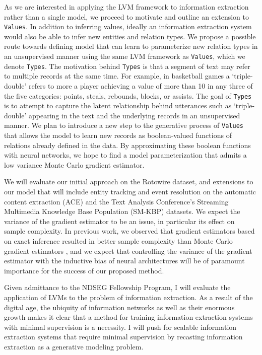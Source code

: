 \documentclass[11pt]{article}
\begin{document}
As we are interested in applying the LVM framework to information extraction rather than a single model,
we proceed to motivate and outline an extension to \texttt{Values}.
In addition to inferring values, ideally an information extraction system 
would also be able to infer new entities and relation types.
We propose a possible route towards defining model that can
learn to parameterize new relation types in an
unsupervised manner using the same LVM framework as \texttt{Values},
which we denote \texttt{Types}.
The motivation behind \texttt{Types} is that a segment of text may refer to multiple records at the same time.
For example, in basketball games a `triple-double' refers to more a player achieving a value of more than 10
in any three of the five categories: points, steals, rebounds, blocks, or assists.
The goal of \texttt{Types} is to attempt to capture the latent relationship behind utterances
such as `triple-double' appearing in the text and the underlying records in an unsupervised manner.
We plan to introduce a new step to the generative process of \texttt{Values} that 
allows the model to learn new records as boolean-valued functions of relations already defined in the data.
By approximating these boolean functions with neural networks, we hope to find a model
parameterization that admits a low variance Monte Carlo gradient estimator.

We will evaluate our initial approach on the Rotowire dataset, and
extensions to our model that will include entity tracking and event resolution on the 
automatic content extraction (ACE) \citep{ace2004} and the Text Analysis Conference's
Streaming Multimedia Knowledge Base Population (SM-KBP) datasets.
We expect the variance of the gradient estimator to be an issue, in particular its
effect on sample complexity. In previous work, we observed that gradient estimators
based on exact inference resulted in better sample complexity than
Monte Carlo gradient estimators \citep{deng2018attn}, and we expect that controlling the variance 
of the gradient estimator with the inductive bias of neural architectures will be of paramount
importance for the success of our proposed method.

Given admittance to the NDSEG Fellowship Program, I will evaluate the application of
LVMs to the problem of information extraction.
As a result of the digital age, the ubiquity of information networks as well as their 
enormous growth makes it clear that a method for training information extraction systems
with minimal supervision is a necessity.
I will push for scalable information extraction systems that require minimal supervision
by recasting information extraction as a generative modeling problem.
\end{document}
